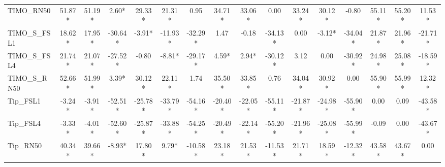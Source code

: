 \documentclass[conference,6pt]{IEEEtran}
\begin{document}
\begin{table}[H]
{\begin{tabular}{@{}l*{15}{c}@{}}
TIMO\_RN50 & 51.87* & 51.19* & 2.60* & 29.33* & 21.31* & 0.95 & 34.71* & 33.06* & 0.00 & 33.24* & 30.12* & -0.80 & 55.11* & 55.20* & 11.53* \\
TIMO\_S\_FSL1 & 18.62* & 17.95* & -30.64* & -3.91* & -11.93* & -32.29* & 1.47 & -0.18 & -34.13* & 0.00 & -3.12* & -34.04* & 21.87* & 21.96* & -21.71* \\
TIMO\_S\_FSL4 & 21.74* & 21.07* & -27.52* & -0.80 & -8.81* & -29.17* & 4.59* & 2.94* & -30.12* & 3.12 & 0.00 & -30.92* & 24.98* & 25.08* & -18.59* \\
TIMO\_S\_RN50 & 52.66* & 51.99* & 3.39* & 30.12* & 22.11* & 1.74 & 35.50* & 33.85* & 0.76 & 34.04* & 30.92* & 0.00 & 55.90* & 55.99* & 12.32* \\
Tip\_FSL1 & -3.24* & -3.91* & -52.51* & -25.78* & -33.79* & -54.16* & -20.40* & -22.05* & -55.11* & -21.87* & -24.98* & -55.90* & 0.00 & 0.09 & -43.58* \\
Tip\_FSL4 & -3.33* & -4.01* & -52.60* & -25.87* & -33.88* & -54.25* & -20.49* & -22.14* & -55.20* & -21.96* & -25.08* & -55.99* & -0.09 & 0.00 & -43.67* \\
Tip\_RN50 & 40.34* & 39.66* & -8.93* & 17.80* & 9.79* & -10.58* & 23.18* & 21.53* & -11.53* & 21.71* & 18.59* & -12.32* & 43.58* & 43.67* & 0.00 \\
\bottomrule
\end{tabular}%
}
\end{table}

\FloatBarrier
\clearpage
\end{document}
